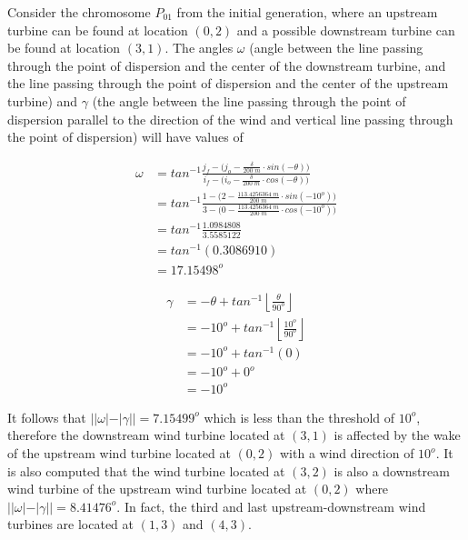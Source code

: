     Consider the chromosome $P_{01}$ from the initial generation, where an upstream turbine can be found at location $(0,2)$ and a possible downstream turbine can be found at location $(3,1)$. The angles $\omega$ (angle between the line passing through the point of dispersion and the center of the downstream turbine, and the line passing through the point of dispersion and the center of the upstream turbine) and $\gamma$ (the angle between the line passing through the point of dispersion parallel to the direction of the wind and vertical line passing through the point of dispersion) will have values of
    \begin{multicols}{2}
        \begin{align*}
            \omega
            &= tan^{-1}\frac{j_f-\Big(j_o-\frac{\delta}{200\;m}\cdot sin(-\theta)\Big)}{i_f-\Big(i_o-\frac{\delta}{200\;m}\cdot cos(-\theta)\Big)} \\
            &= tan^{-1}\frac{1-\Big(2-\frac{113.4256364\;m}{200\;m}\cdot sin(-10^o)\Big)}{3-\Big(0-\frac{113.4256364\;m}{200\;m}\cdot cos(-10^o)\Big)} \\
            &= tan^{-1}\frac{1.0984808}{3.5585122} \\
            &= tan^{-1}(0.3086910) \\ 
            &= 17.15498^o
        \end{align*}
        
        \begin{align*}
            \gamma
            &= -\theta + tan^{-1}\left \lfloor{\frac{\theta}{90^o}}\right \rfloor \\
            &= -10^o + tan^{-1}\left \lfloor{\frac{10^o}{90^o}}\right \rfloor \\
            &= -10^o + tan^{-1}(0) \\
            &= -10^o + 0^o \\ 
            &= -10^o
        \end{align*}
    \end{multicols}
    It follows that $||\omega|-|\gamma||=7.15499^o$ which is less than the threshold of $10^o$, therefore the downstream wind turbine located at $(3,1)$ is affected by the wake of the upstream wind turbine located at $(0,2)$ with a wind direction of $10^o$. It is also computed that the wind turbine located at $(3,2)$ is also a downstream wind turbine of the upstream wind turbine located at $(0,2)$ where $||\omega|-|\gamma||=8.41476^o$. In fact, the third and last upstream-downstream wind turbines are located at $(1,3)$ and $(4,3)$.
